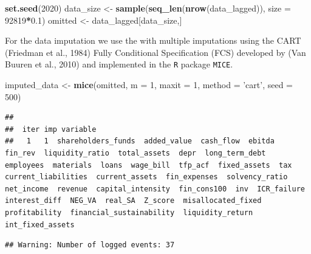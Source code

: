 \documentclass[]{article}
\newenvironment{Shaded}{\begin{snugshade}}{\end{snugshade}}
\newcommand{\DataTypeTok}[1]{\textcolor[rgb]{0.13,0.29,0.53}{#1}}
\newcommand{\DecValTok}[1]{\textcolor[rgb]{0.00,0.00,0.81}{#1}}
\newcommand{\FloatTok}[1]{\textcolor[rgb]{0.00,0.00,0.81}{#1}}
\newcommand{\KeywordTok}[1]{\textcolor[rgb]{0.13,0.29,0.53}{\textbf{#1}}}
\newcommand{\NormalTok}[1]{#1}
\newcommand{\OperatorTok}[1]{\textcolor[rgb]{0.81,0.36,0.00}{\textbf{#1}}}
\newcommand{\StringTok}[1]{\textcolor[rgb]{0.31,0.60,0.02}{#1}}
\begin{document}
\begin{Shaded}
\begin{Highlighting}[]
\KeywordTok{set.seed}\NormalTok{(}\DecValTok{2020}\NormalTok{)}
\NormalTok{data_size <-}\StringTok{ }\KeywordTok{sample}\NormalTok{(}\KeywordTok{seq_len}\NormalTok{(}\KeywordTok{nrow}\NormalTok{(data_lagged)), }\DataTypeTok{size =} \DecValTok{92819}\OperatorTok{*}\FloatTok{0.1}\NormalTok{) }
\NormalTok{omitted <-}\StringTok{ }\NormalTok{data_lagged[data_size,]}
\end{Highlighting}
\end{Shaded}

For the data imputation we use the with multiple imputations using the
CART (Friedman et al., 1984) Fully Conditional Specification (FCS)
developed by (Van Buuren et al., 2010) and implemented in the \texttt{R}
package \texttt{MICE}.

\begin{Shaded}
\begin{Highlighting}[]
\NormalTok{imputed_data <-}\StringTok{ }\KeywordTok{mice}\NormalTok{(omitted, }\DataTypeTok{m =} \DecValTok{1}\NormalTok{, }\DataTypeTok{maxit =} \DecValTok{1}\NormalTok{, }\DataTypeTok{method =} \StringTok{'cart'}\NormalTok{, }\DataTypeTok{seed =} \DecValTok{500}\NormalTok{)}
\end{Highlighting}
\end{Shaded}

\begin{verbatim}
## 
##  iter imp variable
##   1   1  shareholders_funds  added_value  cash_flow  ebitda  fin_rev  liquidity_ratio  total_assets  depr  long_term_debt  employees  materials  loans  wage_bill  tfp_acf  fixed_assets  tax  current_liabilities  current_assets  fin_expenses  solvency_ratio  net_income  revenue  capital_intensity  fin_cons100  inv  ICR_failure  interest_diff  NEG_VA  real_SA  Z_score  misallocated_fixed  profitability  financial_sustainability  liquidity_return  int_fixed_assets
\end{verbatim}

\begin{verbatim}
## Warning: Number of logged events: 37
\end{verbatim}

\begin{Shaded}
\end{Shaded}
\end{document}
